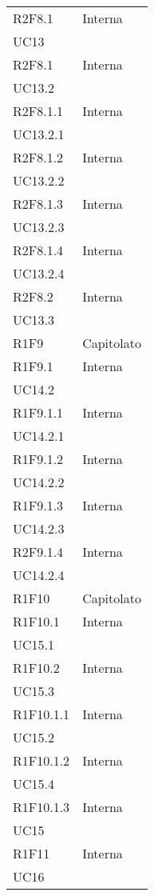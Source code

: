 \begin{longtable}{|C{6.5cm}|C{6.5cm}|}
	R2F8.1 & \centering Interna \\ UC13 \tabularnewline

	R2F8.1 & \centering Interna \\ UC13.2 \tabularnewline

	R2F8.1.1 & \centering Interna \\ UC13.2.1 \tabularnewline

	R2F8.1.2 & \centering Interna \\ UC13.2.2 \tabularnewline

	R2F8.1.3 & \centering Interna \\ UC13.2.3 \tabularnewline

	R2F8.1.4 & \centering Interna \\ UC13.2.4 \tabularnewline

	R2F8.2 & \centering Interna \\ UC13.3 \tabularnewline

	R1F9 &  Capitolato \\

	R1F9.1 & \centering Interna \\ UC14.2 \tabularnewline

	R1F9.1.1 & \centering Interna \\ UC14.2.1 \tabularnewline

	R1F9.1.2 & \centering Interna \\ UC14.2.2 \tabularnewline

	R1F9.1.3 & \centering Interna \\ UC14.2.3 \tabularnewline

	R2F9.1.4 & \centering Interna \\ UC14.2.4 \tabularnewline

	R1F10 & Capitolato \\

	R1F10.1 &  \centering Interna \\ UC15.1 \tabularnewline

	R1F10.2 & \centering Interna \\ UC15.3 \tabularnewline

	R1F10.1.1 &  \centering Interna \\ UC15.2 \tabularnewline

	R1F10.1.2 &  \centering Interna \\ UC15.4 \tabularnewline

	R1F10.1.3 &  \centering Interna \\ UC15 \tabularnewline

	R1F11 & \centering Interna \\ UC16 \tabularnewline


\end{longtable}
